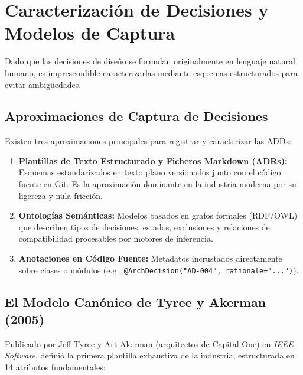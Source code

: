 \section{Caracterización de Decisiones y Modelos de Captura}
\label{sec:caracterizacion-decisiones}

Dado que las decisiones de diseño se formulan originalmente en lenguaje natural humano, es imprescindible caracterizarlas mediante esquemas estructurados para evitar ambigüedades.

\subsection{Aproximaciones de Captura de Decisiones}

Existen tres aproximaciones principales para registrar y caracterizar las ADDs:
\begin{enumerate}[leftmargin=1.5em]
  \item \textbf{Plantillas de Texto Estructurado y Ficheros Markdown (ADRs):} Esquemas estandarizados en texto plano versionados junto con el código fuente en Git. Es la aproximación dominante en la industria moderna por su ligereza y nula fricción.
  \item \textbf{Ontologías Semánticas:} Modelos basados en grafos formales (RDF/OWL) que describen tipos de decisiones, estados, exclusiones y relaciones de compatibilidad procesables por motores de inferencia.
  \item \textbf{Anotaciones en Código Fuente:} Metadatos incrustados directamente sobre clases o módulos (e.g., \texttt{@ArchDecision("AD-004", rationale="...")}).
\end{enumerate}

\subsection{El Modelo Canónico de Tyree y Akerman (2005)}

Publicado por Jeff Tyree y Art Akerman (arquitectos de Capital One) en \emph{IEEE Software}, definió la primera plantilla exhaustiva de la industria, estructurada en 14 atributos fundamentales:

